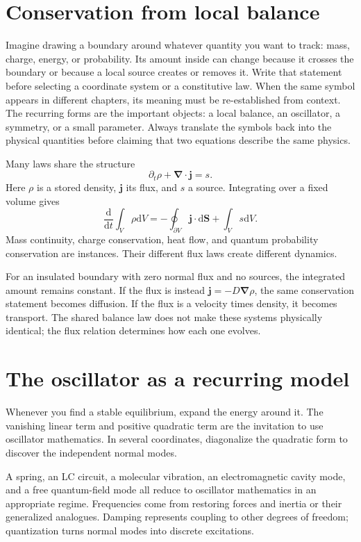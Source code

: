 \documentclass[11pt,oneside]{book}
\newcommand{\dd}{\mathrm{d}}
\newcommand{\vect}[1]{\boldsymbol{#1}}
\newcommand{\grad}{\boldsymbol{\nabla}}
\newcommand{\od}[2]{\frac{\dd #1}{\dd #2}}
\theoremstyle{reviewstyle}
\begin{document}
\section{Conservation from local balance}
Imagine drawing a boundary around whatever quantity you want to track: mass, charge, energy, or probability. Its amount inside can change because it crosses the boundary or because a local source creates or removes it. Write that statement before selecting a coordinate system or a constitutive law. When the same symbol appears in different chapters, its meaning must be re-established from context. The recurring forms are the important objects: a local balance, an oscillator, a symmetry, or a small parameter. Always translate the symbols back into the physical quantities before claiming that two equations describe the same physics.

Many laws share the structure
\begin{equation}\partial_t\rho+\grad\cdot\vect j=s.\end{equation}
Here $\rho$ is a stored density, $\vect j$ its flux, and $s$ a source. Integrating over a fixed volume gives
\begin{equation}\od{}{t}\int_V\rho\dd V=-\oint_{\partial V}\vect j\cdot\dd\vect S+\int_Vs\dd V.\end{equation}
Mass continuity, charge conservation, heat flow, and quantum probability conservation are instances. Their different flux laws create different dynamics.

For an insulated boundary with zero normal flux and no sources, the integrated amount remains constant. If the flux is instead $\vect j=-D\grad\rho$, the same conservation statement becomes diffusion. If the flux is a velocity times density, it becomes transport. The shared balance law does not make these systems physically identical; the flux relation determines how each one evolves.

\section{The oscillator as a recurring model}
Whenever you find a stable equilibrium, expand the energy around it. The vanishing linear term and positive quadratic term are the invitation to use oscillator mathematics. In several coordinates, diagonalize the quadratic form to discover the independent normal modes.

A spring, an LC circuit, a molecular vibration, an electromagnetic cavity mode, and a free quantum-field mode all reduce to oscillator mathematics in an appropriate regime. Frequencies come from restoring forces and inertia or their generalized analogues. Damping represents coupling to other degrees of freedom; quantization turns normal modes into discrete excitations.
\end{document}
